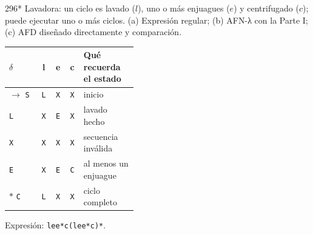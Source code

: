\documentclass[11pt]{article}
\begin{document}
\begin{ejercicio}{296}{*}
Lavadora: un ciclo es lavado ($l$), uno o más enjuagues ($e$) y centrifugado ($c$); puede ejecutar uno o más ciclos. (a) Expresión regular; (b) AFN-λ con la Parte I; (c) AFD diseñado directamente y comparación.
\end{ejercicio}
\proc \begin{center}\small\begin{tabular}{lcccp{0.42\linewidth}}\toprule
$\delta$ & l & e & c & Qué recuerda el estado \\\midrule
$\to$ \texttt{S} & \texttt{L} & \texttt{X} & \texttt{X} & inicio \\
 \texttt{L} & \texttt{X} & \texttt{E} & \texttt{X} & lavado hecho \\
 \texttt{X} & \texttt{X} & \texttt{X} & \texttt{X} & secuencia inválida \\
 \texttt{E} & \texttt{X} & \texttt{E} & \texttt{C} & al menos un enjuague \\
$*$ \texttt{C} & \texttt{L} & \texttt{X} & \texttt{X} & ciclo completo \\
\bottomrule\end{tabular}\end{center}
\par Expresión: \texttt{lee*c(lee*c)*}.
\end{document}
